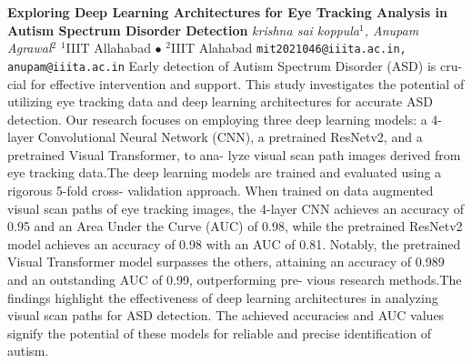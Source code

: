 
    \begin{conf-abstract}[]
        {\textbf{Exploring Deep Learning Architectures for Eye Tracking Analysis in Autism Spectrum Disorder Detection}}
        {\textit{krishna sai koppula$^{1}$, Anupam Agrawal$^{2}$}}
        {$^{1}$IIIT Allahabad $\bullet$ $^{2}$IIIT Alahabad}
        {\texttt{mit2021046@iiita.ac.in, anupam@iiita.ac.in}}
        { Early detection of Autism Spectrum Disorder (ASD) is cru- cial for effective intervention and support. This study investigates the potential of utilizing eye tracking data and deep learning architectures for accurate ASD detection. Our research focuses on employing three deep learning models: a 4-layer Convolutional Neural Network (CNN), a pretrained ResNetv2, and a pretrained Visual Transformer, to ana- lyze visual scan path images derived from eye tracking data.The deep learning models are trained and evaluated using a rigorous 5-fold cross- validation approach. When trained on data augmented visual scan paths of eye tracking images, the 4-layer CNN achieves an accuracy of 0.95 and an Area Under the Curve (AUC) of 0.98, while the pretrained ResNetv2 model achieves an accuracy of 0.98 with an AUC of 0.81. Notably, the pretrained Visual Transformer model surpasses the others, attaining an accuracy of 0.989 and an outstanding AUC of 0.99, outperforming pre- vious research methods.The findings highlight the effectiveness of deep learning architectures in analyzing visual scan paths for ASD detection. The achieved accuracies and AUC values signify the potential of these models for reliable and precise identification of autism.}
    \end{conf-abstract}
        